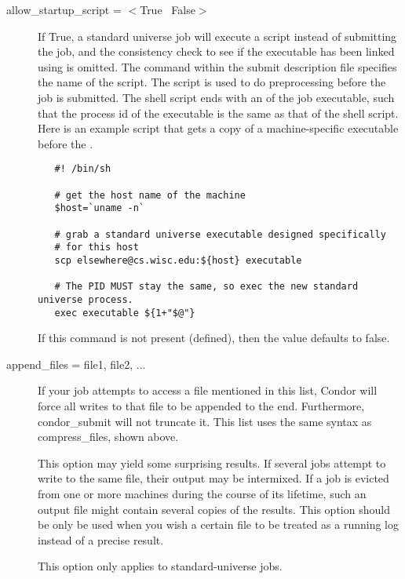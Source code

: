 \begin{description} 

\item[allow\_startup\_script = $<$True \Bar\ False$>$]
If True, a standard universe job will execute a script
instead of submitting the job,
and the consistency check to see if the executable has
been linked using  is omitted.
The  command within the submit description
file specifies the name of the script.
The script is used to do preprocessing before the
job is submitted.
The shell script ends with an  of the
job executable, such that the process id of the executable is the
same as that of the shell script.
Here is an example script that gets a copy of a machine-specific
executable before the .
\footnotesize
\begin{verbatim} 
   #! /bin/sh

   # get the host name of the machine
   $host=`uname -n`

   # grab a standard universe executable designed specifically
   # for this host
   scp elsewhere@cs.wisc.edu:${host} executable

   # The PID MUST stay the same, so exec the new standard universe process.
   exec executable ${1+"$@"}
\end{verbatim} 
\normalsize
If this command is not present (defined), then the value
defaults to false.


\item[append\_files = file1, file2, ...]

If your job attempts to access a file mentioned in this list,
Condor will force all writes to that file to be appended to the end.
Furthermore, condor\_submit will not truncate it.
This list uses the same syntax as compress\_files, shown above.

This option may yield some surprising results.  If several
jobs attempt to write to the same file, their output may be intermixed.
If a job is evicted from one or more machines during the course of its
lifetime, such an output file might contain several copies of the results.
This option should be only be used when you wish a certain file to be
treated as a running log instead of a precise result.

This option only applies to standard-universe jobs.


\end{description}
